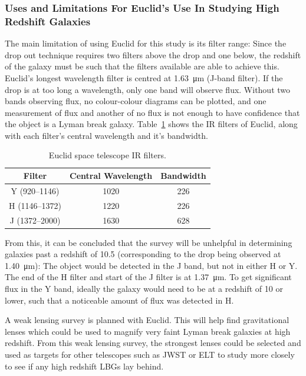 	\subsubsection{Uses and Limitations For Euclid's Use In Studying High Redshift Galaxies} %
	\label{ssub:uses_and_limitations_for_euclid_s_use_in_studying_high_redshift_galaxies}
		The main limitation of using Euclid for this study is its filter range: Since the drop out technique requires two filters above the drop and one below, the redshift of the galaxy must be such that the filters available are able to achieve this. Euclid's longest wavelength filter is centred at \SI{1.63}{\micro\metre} (J-band filter). If the drop is at too long a wavelength, only one band will observe flux. Without two bands observing flux, no colour-colour diagrams can be plotted, and one measurement of flux and another of no flux is not enough to have confidence that the object is a Lyman break galaxy. Table~\ref{fig:euclid_ir_filters} shows the IR filters of Euclid, along with each filter's central wavelength and it's bandwidth.
		\begin{table}[ht]
			\centering
				\begin{tabular}{c|c|c}
					Filter & Central Wavelength & Bandwidth \\
					\hline\hline
					Y (920--1146) & 1020 & 226 \\
					H (1146--1372) & 1220 & 226 \\
					J (1372--2000) & 1630 & 628 \\
				\end{tabular}
				\caption{Euclid space telescope IR filters.\label{fig:euclid_ir_filters}}
		\end{table}

		From this, it can be concluded that the survey will be unhelpful in determining galaxies past a redshift of 10.5 (corresponding to the drop being observed at \SI{1.40}{\micro\metre}): The object would be detected in the J band, but not in either H or Y. The end of the H filter and start of the J filter is at \SI{1.37}{\micro\metre}. To get significant flux in the Y band, ideally the galaxy would need to be at a redshift of 10 or lower, such that a noticeable amount of flux was detected in H.

		A weak lensing survey is planned with Euclid. This will help find gravitational lenses which could be used to magnify very faint Lyman break galaxies at high redshift. From this weak lensing survey, the strongest lenses could be selected and used as targets for other telescopes such as JWST or ELT to study more closely to see if any high redshift LBGs lay behind.

